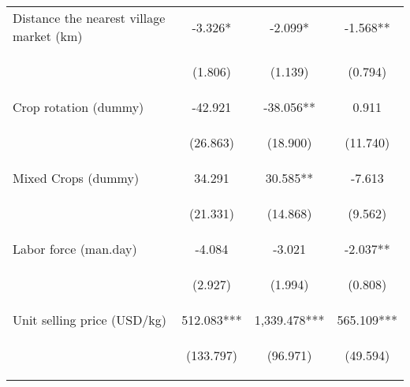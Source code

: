 \begin{center}
\begin{tabular}{lccc}
Distance the nearest village market (km) & -3.326* & -2.099* & -1.568** \\
\vspace{4pt} & \begin{footnotesize}(1.806)\end{footnotesize} & \begin{footnotesize}(1.139)\end{footnotesize} & \begin{footnotesize}(0.794)\end{footnotesize} \\
Crop rotation (dummy) & -42.921 & -38.056** & 0.911 \\
\vspace{4pt} & \begin{footnotesize}(26.863)\end{footnotesize} & \begin{footnotesize}(18.900)\end{footnotesize} & \begin{footnotesize}(11.740)\end{footnotesize} \\
Mixed Crops (dummy) & 34.291 & 30.585** & -7.613 \\
\vspace{4pt} & \begin{footnotesize}(21.331)\end{footnotesize} & \begin{footnotesize}(14.868)\end{footnotesize} & \begin{footnotesize}(9.562)\end{footnotesize} \\
Labor force (man.day) & -4.084 & -3.021 & -2.037** \\
\vspace{4pt} & \begin{footnotesize}(2.927)\end{footnotesize} & \begin{footnotesize}(1.994)\end{footnotesize} & \begin{footnotesize}(0.808)\end{footnotesize} \\
Unit selling price (USD/kg) & 512.083*** & 1,339.478*** & 565.109*** \\
\vspace{4pt} & \begin{footnotesize}(133.797)\end{footnotesize} & \begin{footnotesize}(96.971)\end{footnotesize} & \begin{footnotesize}(49.594)\end{footnotesize} \\

\end{tabular}
\end{center}
